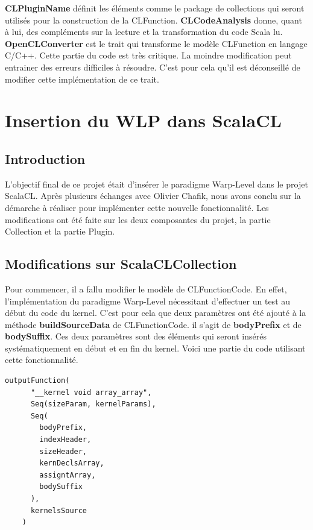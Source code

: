 \documentclass[a4paper,11pt]{report}
\begin{document}
{{{ {\bf CLPluginName} définit les éléments comme le package de collections qui seront utilisés pour la construction de la CLFunction. {\bf CLCodeAnalysis} donne, quant à lui, des compléments sur la lecture et la transformation du code Scala lu.\\

 {\bf OpenCLConverter} est le trait qui transforme le modèle CLFunction en langage C/C++. Cette partie du code est très critique. La moindre modification peut entrainer des erreurs difficiles à résoudre. C'est pour cela qu'il est déconseillé de modifier cette implémentation de ce trait.\\
} 

\section{Insertion du WLP dans ScalaCL}
\vspace{6mm}
\subsection{Introduction}
\vspace{6mm}
\normalsize{
L'objectif final de ce projet était d'insérer le paradigme Warp-Level dans le projet ScalaCL. Après plusieurs échanges avec Olivier Chafik, nous avons conclu sur la démarche à réaliser pour implémenter cette nouvelle fonctionnalité. Les modifications ont été faite sur les deux composantes du projet, la partie Collection et la partie Plugin.\\
}

\subsection{Modifications sur ScalaCLCollection}
\vspace{6mm}
\normalsize{
Pour commencer, il a fallu modifier le modèle de CLFunctionCode. En effet, l'implémentation du paradigme Warp-Level nécessitant d'effectuer un test au début du code du kernel. C'est pour cela que deux paramètres ont été ajouté à la méthode {\bf buildSourceData} de CLFunctionCode. il s'agit de {\bf bodyPrefix} et de {\bf bodySuffix}. Ces deux paramètres sont des éléments qui seront insérés systématiquement en début et en fin du kernel. Voici une partie du code utilisant cette fonctionnalité.
}

\begin{lstlisting}
outputFunction(
      "__kernel void array_array",
      Seq(sizeParam, kernelParams),
      Seq(
        bodyPrefix,
        indexHeader, 
        sizeHeader,
        kernDeclsArray,
        assigntArray,
        bodySuffix
      ),
      kernelsSource
    )
\end{lstlisting}

}}
\end{document}
